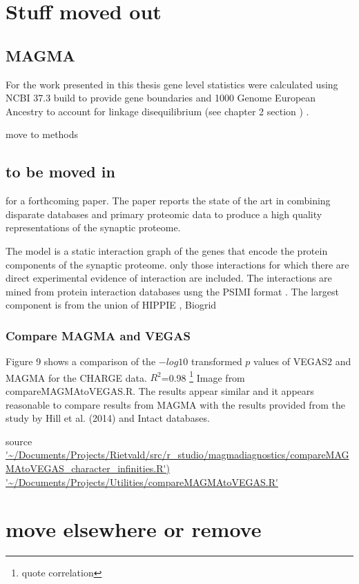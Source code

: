 
\section{Stuff moved out}
\subsection{MAGMA}
For the work presented in this thesis gene level statistics were calculated using NCBI 37.3 build to provide gene boundaries and 1000 Genome European Ancestry to account for linkage disequilibrium (see chapter 2 section ) . 

move to methods
\subsection{to be moved in}
for a forthcoming paper. The paper reports the state of the art in combining disparate databases and primary proteomic data to produce a high quality representations of the synaptic proteome. 

The model is a static interaction graph of the genes that encode the protein components of the synaptic proteome. only those interactions for which there are direct experimental evidence of interaction are included. The interactions are mined from protein interaction databases usng the PSIMI format \cite{hermjakob2004hupo}. The largest component is from the union of HIPPIE \cite{schaefer2012hippie}, Biogrid \cite{oughtred2019biogrid}

\subsubsection{Compare MAGMA and VEGAS}
Figure 9 shows a comparison of the $-log10$ transformed $p$ values of VEGAS2 and MAGMA for the CHARGE data. $R^2$=0.98 \footnote{quote correlation} Image from compareMAGMAtoVEGAS.R. The results appear similar and it appears reasonable to compare results from MAGMA with the results provided from the study by Hill et al. (2014)
and Intact  \cite{hermjakob2004intact} databases. %

source \url{'~/Documents/Projects/Rietvald/src/r_studio/magmadiagnostics/compareMAGMAtoVEGAS_character_infinities.R')} \url{'~/Documents/Projects/Utilities/compareMAGMAtoVEGAS.R'}

\section{move elsewhere or remove}
